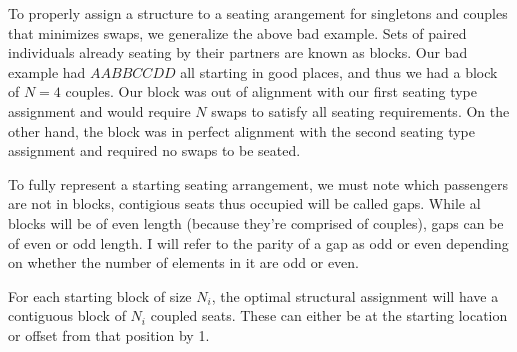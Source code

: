 \documentclass[11pt,twocolumn]{article}
\begin{document}
To properly assign a structure to a seating arangement for singletons and couples that minimizes swaps, we generalize the above bad example.  Sets of paired individuals already seating by their partners are known as blocks.  Our bad example had $AABBCCDD$ all starting in good places, and thus we had a block of $N = 4$ couples.  Our block was out of alignment with our first seating type assignment and would require $N$ swaps to satisfy all seating requirements.  On the other hand, the block was in perfect alignment with the second seating type assignment and required no swaps to be seated.

\begin{figure}[H]
\centering
{}
\end{figure}

To fully represent a starting seating arrangement, we must note which passengers are not in blocks, contigious seats thus occupied will be called gaps.  While al blocks will be of even length (because they're comprised of couples), gaps can be of even or odd length.  I will refer to the parity of a gap as odd or even depending on whether the number of elements in it are odd or even.

\begin{lem} \label{lemma:ParityOnly}
For each starting block of size $N_i$, the optimal structural assignment will have a contiguous block of $N_i$ coupled seats. These can either be at the starting location or offset from that position by 1.
\end{lem}
\end{document}
